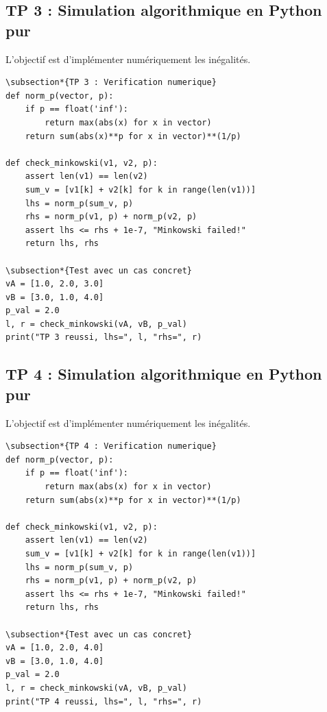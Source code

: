 \documentclass[11pt,a4paper]{article}
\begin{document}
\subsection*{TP 3 : Simulation algorithmique en Python pur}

L'objectif est d'implémenter numériquement les inégalités.

\begin{lstlisting}
\subsection*{TP 3 : Verification numerique}
def norm_p(vector, p):
    if p == float('inf'):
        return max(abs(x) for x in vector)
    return sum(abs(x)**p for x in vector)**(1/p)

def check_minkowski(v1, v2, p):
    assert len(v1) == len(v2)
    sum_v = [v1[k] + v2[k] for k in range(len(v1))]
    lhs = norm_p(sum_v, p)
    rhs = norm_p(v1, p) + norm_p(v2, p)
    assert lhs <= rhs + 1e-7, "Minkowski failed!"
    return lhs, rhs

\subsection*{Test avec un cas concret}
vA = [1.0, 2.0, 3.0]
vB = [3.0, 1.0, 4.0]
p_val = 2.0
l, r = check_minkowski(vA, vB, p_val)
print("TP 3 reussi, lhs=", l, "rhs=", r)
\end{lstlisting}


\subsection*{TP 4 : Simulation algorithmique en Python pur}

L'objectif est d'implémenter numériquement les inégalités.

\begin{lstlisting}
\subsection*{TP 4 : Verification numerique}
def norm_p(vector, p):
    if p == float('inf'):
        return max(abs(x) for x in vector)
    return sum(abs(x)**p for x in vector)**(1/p)

def check_minkowski(v1, v2, p):
    assert len(v1) == len(v2)
    sum_v = [v1[k] + v2[k] for k in range(len(v1))]
    lhs = norm_p(sum_v, p)
    rhs = norm_p(v1, p) + norm_p(v2, p)
    assert lhs <= rhs + 1e-7, "Minkowski failed!"
    return lhs, rhs

\subsection*{Test avec un cas concret}
vA = [1.0, 2.0, 4.0]
vB = [3.0, 1.0, 4.0]
p_val = 2.0
l, r = check_minkowski(vA, vB, p_val)
print("TP 4 reussi, lhs=", l, "rhs=", r)
\end{lstlisting}
\end{document}
